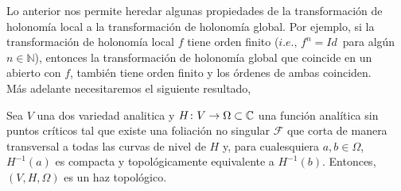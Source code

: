 Lo anterior nos permite heredar algunas propiedades de la transformación de holonomía local a la transformación de holonomía global. Por ejemplo, si la transformación de holonomía local  $f$ tiene orden finito ($\mathit{i.e.},\, f^{n}=Id\,$ para algún $n\in\mathbb{N}$), entonces la transformación de holonomía global que coincide en un abierto con $f$, también tiene orden finito y los órdenes de ambas coinciden.\\

Más adelante necesitaremos el siguiente resultado,

\begin{Lema}
\label{Lema:HazTopologico}
Sea $V$ una dos variedad analitica y $H\colon V \rightarrow\Omega\subset\mathbb{C}$ una función analítica sin puntos críticos tal que existe una foliación no singular $\mathcal{F}$ que corta de manera transversal a todas las curvas de nivel de $H$ y, para cualesquiera $a,b\in \Omega$, $H^{-1}(a)$ es compacta y topológicamente equivalente a $H^{-1}(b)$. Entonces, $(V,H,\Omega)$ es un haz topológico.
\end{Lema}
